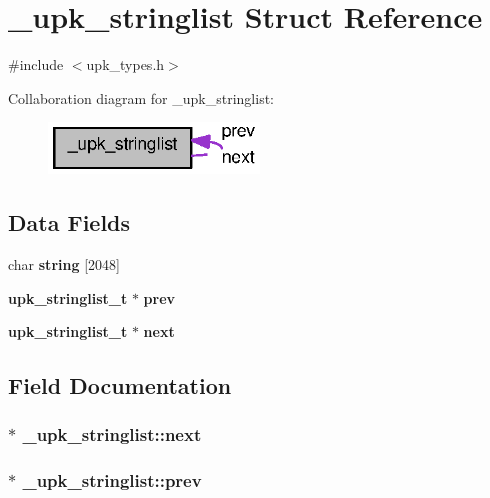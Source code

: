 \section{\_\-upk\_\-stringlist Struct Reference}
\label{struct__upk__stringlist}


{\ttfamily \#include $<$upk\_\-types.h$>$}



Collaboration diagram for \_\-upk\_\-stringlist:
\nopagebreak
\begin{figure}[H]
\begin{center}
\leavevmode
\includegraphics[width=159pt]{struct__upk__stringlist__coll__graph}
\end{center}
\end{figure}
\subsection*{Data Fields}
\begin{DoxyCompactItemize}
\item 
char {\bf string} [2048]
\item 
{\bf upk\_\-stringlist\_\-t} $\ast$ {\bf prev}
\item 
{\bf upk\_\-stringlist\_\-t} $\ast$ {\bf next}
\end{DoxyCompactItemize}


\subsection{Field Documentation}
\subsubsection[{next}]{ $\ast$ {\bf \_\-upk\_\-stringlist::next}}\label{struct__upk__stringlist_a6c5baa2d23449941b5708530637c3836}
\subsubsection[{prev}]{ $\ast$ {\bf \_\-upk\_\-stringlist::prev}}\label{struct__upk__stringlist_ad9416468a14e706d99ad9f00ab70d9a4}
